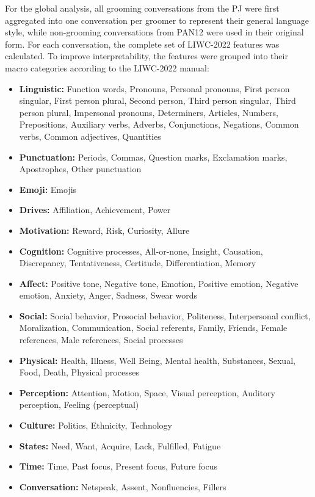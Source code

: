 For the global analysis, all grooming conversations from the PJ were first aggregated into one conversation per groomer to represent their general language style, while non-grooming conversations from PAN12 were used in their original form. 
For each conversation, the complete set of LIWC-2022 features was calculated.  
To improve interpretability, the features were grouped into their macro categories according to the LIWC-2022 manual:

\begin{itemize}
    \item \textbf{Linguistic:} Function words, Pronouns, Personal pronouns, First person singular, First person plural, Second person, Third person singular, Third person plural, Impersonal pronouns, Determiners, Articles, Numbers, Prepositions, Auxiliary verbs, Adverbs, Conjunctions, Negations, Common verbs, Common adjectives, Quantities
    \item \textbf{Punctuation:} Periods, Commas, Question marks, Exclamation marks, Apostrophes, Other punctuation
    \item \textbf{Emoji:} Emojis
    \item \textbf{Drives:} Affiliation, Achievement, Power
    \item \textbf{Motivation:} Reward, Risk, Curiosity, Allure
    \item \textbf{Cognition:} Cognitive processes, All-or-none, Insight, Causation, Discrepancy, Tentativeness, Certitude, Differentiation, Memory
    \item \textbf{Affect:} Positive tone, Negative tone, Emotion, Positive emotion, Negative emotion, Anxiety, Anger, Sadness, Swear words
    \item \textbf{Social:} Social behavior, Prosocial behavior, Politeness, Interpersonal conflict, Moralization, Communication, Social referents, Family, Friends, Female references, Male references, Social processes
    \item \textbf{Physical:} Health, Illness, Well Being, Mental health, Substances, Sexual, Food, Death, Physical processes
    \item \textbf{Perception:} Attention, Motion, Space, Visual perception, Auditory perception, Feeling (perceptual)
    \item \textbf{Culture:} Politics, Ethnicity, Technology
    \item \textbf{States:} Need, Want, Acquire, Lack, Fulfilled, Fatigue
    \item \textbf{Time:} Time, Past focus, Present focus, Future focus
    \item \textbf{Conversation:} Netspeak, Assent, Nonfluencies, Fillers
\end{itemize}


